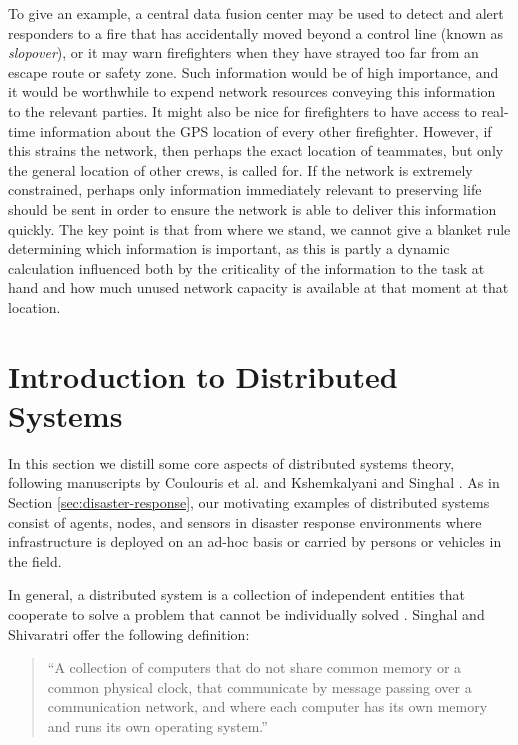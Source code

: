 \documentclass[]             %
{NASA}                       %
\theoremstyle{definition}
\begin{document}
To give an example, a central data fusion center may be used to detect
and alert responders to a fire that has accidentally moved beyond a
control line (known as \emph{slopover}), or it may warn firefighters
when they have strayed too far from an escape route or safety
zone. Such information would be of high importance, and it would be
worthwhile to expend network resources conveying this information to
the relevant parties. It might also be nice for firefighters to have
access to real-time information about the GPS location of every other
firefighter. However, if this strains the network, then perhaps the
exact location of teammates, but only the general location of other
crews, is called for. If the network is extremely constrained, perhaps
only information immediately relevant to preserving life should be
sent in order to ensure the network is able to deliver this
information quickly. The key point is that from where we stand, we
cannot give a blanket rule determining which information is important,
as this is partly a dynamic calculation influenced both by the
criticality of the information to the task at hand and how much unused
network capacity is available at that moment at that location.

\section{Introduction to Distributed Systems}
\label{sec:background}
In this section we distill some core aspects of distributed systems
theory, following manuscripts by Coulouris et al.
\cite{coulouris2005distributed} and Kshemkalyani and Singhal
\cite{kshemkalyani_singhal_2008}. As in Section
\ref{sec:disaster-response}, our motivating examples of distributed
systems consist of agents, nodes, and sensors in disaster response
environments where infrastructure is deployed on an ad-hoc basis or
carried by persons or vehicles in the field.

In general, a distributed system is a collection of independent
entities that cooperate to solve a problem that cannot be individually
solved \cite{kshemkalyani_singhal_2008}. Singhal and Shivaratri
\cite{10.5555/562065} offer the following definition:
\begin{quote}
  ``A collection of computers that do not share common memory or a common
  physical clock, that communicate by message passing over a communication
  network, and where each computer has its own memory and runs its own
  operating system.''
\end{quote}
\end{document}
